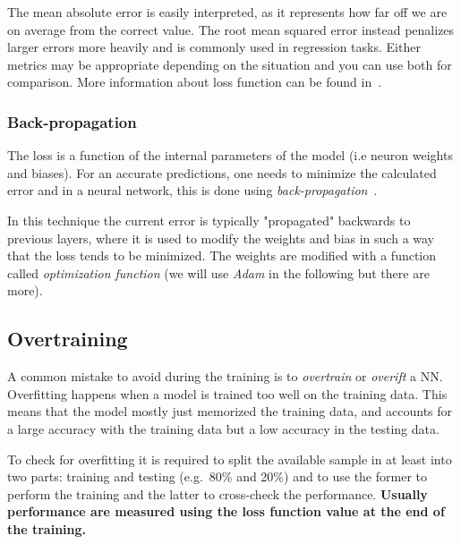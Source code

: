The mean absolute error is easily interpreted, as it represents how
far off we are on average from the correct value. The root mean squared 
error instead penalizes larger errors more heavily and is commonly used in
regression tasks. Either metrics may be appropriate depending on the
situation and you can use both for comparison. More information 
about loss function can be found in~\cite{bib:loss_function}.

\subsubsection{Back-propagation}
The loss is a function of the internal parameters of the model
(i.e neuron weights and biases). For an accurate predictions, one needs to
minimize the calculated error and in a neural network, this is done using
\emph{back-propagation}~\cite{bib:backpropagation}.

In this technique the current error is typically "propagated" backwards to previous layers,
where it is used to modify the weights and bias in such a way that the loss tends to be minimized.
The weights are modified with a function called \emph{optimization function}
(we will use \emph{Adam} in the following but there are more).


\subsection{Overtraining}
A common mistake to avoid during the training is to \emph{overtrain} or \emph{overift} a NN. %
Overfitting happens when a model is trained too well on the training data. This means that the model mostly just memorized the training data, and accounts for a large accuracy with the training data but a low accuracy in the testing data. 

To check for overfitting it is required to split the available sample in at least into two parts:
training and testing (e.g.~80\% and 20\%) and to use the former to perform the training and the latter 
to cross-check the performance.
\textbf{Usually performance are measured using the loss function value at the end of the training.}


